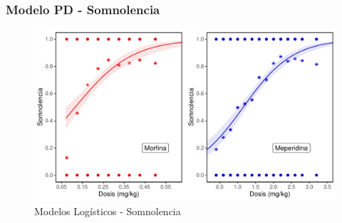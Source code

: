 \documentclass[10pt]{beamer}
\begin{document}
	
	\begin{frame}
		\frametitle{Modelo PD - Somnolencia}
		\begin{figure}[H]
			\centering
			\includegraphics[width=0.9\linewidth]{Figuras/Somnolencia}
			\caption[Modelos Logísticos - Somnolencia]{Modelos Logísticos - Somnolencia}
			\label{fig:1}
		\end{figure}
	\end{frame}
\end{document}
